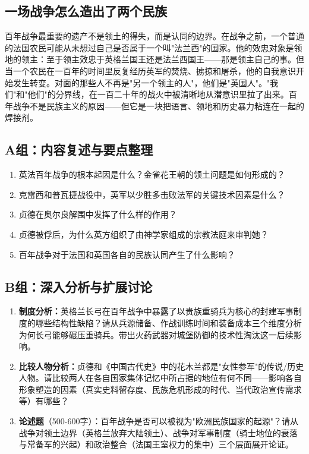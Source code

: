 \documentclass[a4paper,12pt]{ctexart}
\begin{document}
\subsection{一场战争怎么造出了两个民族}

百年战争最重要的遗产不是领土的得失，而是认同的边界。在战争之前，一个普通的法国农民可能从未想过自己是否属于一个叫"法兰西"的国家。他的效忠对象是领地的领主：至于领主效忠于英格兰国王还是法兰西国王——那是领主自己的事。但当一个农民在一百年的时间里反复经历英军的焚烧、掳掠和屠杀，他的自我意识开始发生转变。对面的那些人不再是"另一个领主的人"，他们是"英国人"。"我们"和"他们"的分界线，在一百二十年的战火中被清晰地从潜意识里拉了出来。百年战争不是民族主义的原因——但它是一块把语言、领地和历史暴力粘连在一起的焊接剂。

\subsection*{A组：内容复述与要点整理}

\begin{enumerate}[label=A\arabic*.]
  \item 英法百年战争的根本起因是什么？金雀花王朝的领土问题是如何形成的？
  \item 克雷西和普瓦捷战役中，英军以少胜多击败法军的关键技术因素是什么？
  \item 贞德在奥尔良解围中发挥了什么样的作用？
  \item 贞德被俘后，为什么英方组织了由神学家组成的宗教法庭来审判她？
  \item 百年战争对于法国和英国各自的民族认同产生了什么影响？
\end{enumerate}

\subsection*{B组：深入分析与扩展讨论}

\begin{enumerate}[label=B\arabic*.]
  \item \textbf{制度分析：}英格兰长弓在百年战争中暴露了以贵族重骑兵为核心的封建军事制度的哪些结构性缺陷？请从兵源储备、作战训练时间和装备成本三个维度分析为何长弓能够碾压重骑兵。带出火药武器对城堡防御的技术性淘汰这一后续影响。
  \item \textbf{比较人物分析：}贞德和《中国古代史》中的花木兰都是"女性参军"的传说/历史人物。请比较两人在各自国家集体记忆中所占据的地位有何不同——影响各自形象塑造的因素（真实史料留存度、民族危机形成的时代、当代政治宣传需求等）有哪些？
  \item \textbf{论述题}（500-600字）：百年战争是否可以被视为"欧洲民族国家的起源"？请从战争对领土边界（英格兰放弃大陆领土）、战争对军事制度（骑士地位的衰落与常备军的兴起）和政治整合（法国王室权力的集中）三个层面展开论证。
\end{enumerate}
\end{document}
